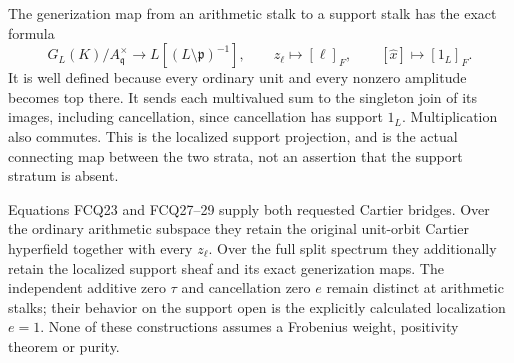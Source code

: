 The generization map from an arithmetic stalk to a
support stalk has the exact formula
\begin{equation}\tag{FCQ29}
G_L(K)/A_{\mathfrak q}^\times
       \longrightarrow L[(L\setminus\mathfrak p)^{-1}],
\qquad
z_\ell\longmapsto[\ell]_F,\qquad
[\widehat x]\longmapsto[1_L]_F .
\end{equation}
It is well defined because every ordinary unit and
every nonzero amplitude becomes top there. It sends
each multivalued sum to the singleton join of its
images, including cancellation, since cancellation
has support $1_L$. Multiplication also commutes.
This is the localized support projection, and is
the actual connecting map between the two strata,
not an assertion that the support stratum is absent.

Equations FCQ23 and FCQ27--29 supply both requested
Cartier bridges. Over the ordinary arithmetic
subspace they retain the original unit-orbit
Cartier hyperfield together with every $z_\ell$.
Over the full split spectrum they additionally
retain the localized support sheaf and its exact
generization maps. The independent additive zero
$\tau$ and cancellation zero $e$ remain distinct
at arithmetic stalks; their behavior on the support
open is the explicitly calculated localization
$e=1$. None of these constructions assumes a
Frobenius weight, positivity theorem or purity.
